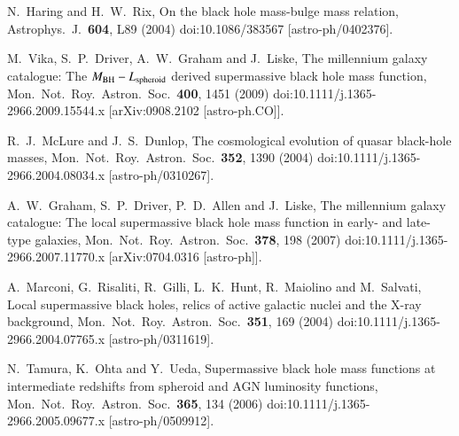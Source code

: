 \documentclass[aps,prd,twocolumn,superscriptaddress,tightenlines,nofootinbib]{revtex4-1}
\begin{document}
\begin{thebibliography}{99}
  N.~Haring and H.~W.~Rix,
  {\color{rossoCP3} On the black hole mass-bulge mass relation},
  Astrophys.\ J.\  {\bf 604}, L89 (2004)
  doi:10.1086/383567
  [astro-ph/0402376].






  M.~Vika, S.~P.~Driver, A.~W.~Graham and J.~Liske,
    {\color{rossoCP3} The millennium galaxy catalogue: The $M_{\rm BH}
      - L_{\rm spheroid}$ derived supermassive black hole mass function},
  Mon.\ Not.\ Roy.\ Astron.\ Soc.\  {\bf 400}, 1451 (2009)
  doi:10.1111/j.1365-2966.2009.15544.x
  [arXiv:0908.2102 [astro-ph.CO]].




  R.~J.~McLure and J.~S.~Dunlop,
   {\color{rossoCP3} The cosmological evolution of quasar black-hole masses},
  Mon.\ Not.\ Roy.\ Astron.\ Soc.\  {\bf 352}, 1390 (2004)
  doi:10.1111/j.1365-2966.2004.08034.x
  [astro-ph/0310267].


  A.~W.~Graham, S.~P.~Driver, P.~D.~Allen and J.~Liske,
    {\color{rossoCP3} The millennium galaxy catalogue: The local
      supermassive black hole mass function in early-  and late-type galaxies},
  Mon.\ Not.\ Roy.\ Astron.\ Soc.\  {\bf 378}, 198 (2007)
  doi:10.1111/j.1365-2966.2007.11770.x
  [arXiv:0704.0316 [astro-ph]].



  A.~Marconi, G.~Risaliti, R.~Gilli, L.~K.~Hunt, R.~Maiolino and M.~Salvati,
   {\color{rossoCP3} Local supermassive black holes, relics of active galactic nuclei and the X-ray background},
  Mon.\ Not.\ Roy.\ Astron.\ Soc.\  {\bf 351}, 169 (2004)
  doi:10.1111/j.1365-2966.2004.07765.x
  [astro-ph/0311619].


  N.~Tamura, K.~Ohta and Y.~Ueda,
   {\color{rossoCP3} Supermassive black hole mass functions at intermediate redshifts from spheroid and AGN luminosity functions},
  Mon.\ Not.\ Roy.\ Astron.\ Soc.\  {\bf 365}, 134 (2006)
  doi:10.1111/j.1365-2966.2005.09677.x
  [astro-ph/0509912].




\end{thebibliography}
\end{document}
